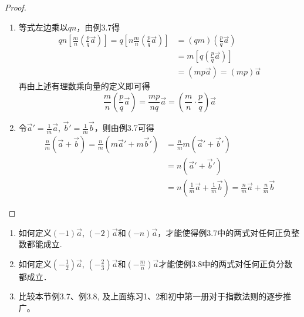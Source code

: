 \begin{proof}
\begin{enumerate}
    \item 等式左边乘以$qn$，由例3.7得
\[\begin{split}
qn\left[\frac{m}{n}\left(\frac{p}{q}\vec{a}\right)\right]=q\left[n\frac{m}{n}\left(\frac{p}{q}\vec{a}\right)\right]&=(qm)\left(\frac{p}{q}\vec{a}\right)\\
&=m\left[q\left(\frac{p}{q}\vec{a}\right)\right]\\
&=\left(mp\vec{a}\right)=(mp)\vec{a}
\end{split}\]
再由上述有理数乘向量的定义即可得
\[\frac{m}{n}\left(\frac{p}{q}\vec{a}\right)=\frac{mp}{nq}\vec{a}=\left(\frac{m}{n}\cdot \frac{p}{q}\right)\vec{a}\]

\item 令$\vec{a}'=\frac{1}{m}\vec{a}$, $\vec{b}'=\frac{1}{m}\vec{b}$，则由例3.7可得
\[\begin{split}
    \frac{n}{m}\left(\vec{a}+\vec{b}\right)=\frac{n}{m}\left(m\vec{a}'+m\vec{b}'\right)&=\frac{n}{m}m\left(\vec{a}'+\vec{b}'\right)\\
&=n\left(\vec{a}'+\vec{b}'\right)\\
&=n\left(\frac{1}{m}\vec{a}+\frac{1}{m}\vec{b}\right)
=\frac{n}{m}\vec{a}+\frac{n}{m}\vec{b}
\end{split}\]
\end{enumerate}
\end{proof}

\begin{ex}
\begin{enumerate}
    \item 如何定义$(-1)\vec{a}$, $(-2)\vec{a}$和$(-n)\vec{a}$，才能使得例3.7中的两式对任何正负整数都能成立.
    \item 如何定义$\left(-\frac{1}{2}\right)\vec{a}$, $\left(-\frac{2}{3}\right)\vec{a}$和$\left(-\frac{m}{n}\right)\vec{a}$才能使例3.8中的两式对任何正负分数都成立．
    \item 比较本节例3.7、例3.8, 及上面练习1、2和初中第一册对于指数法则的逐步推广。
\end{enumerate}   
\end{ex}

